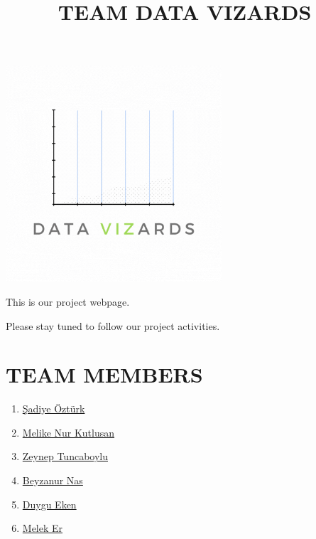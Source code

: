 \documentclass[
  11pt,
  a4paper,
  DIV=11,
  numbers=noendperiod]{scrartcl}
\title{TEAM DATA VIZARDS}
\author{}
\date{}
\begin{document}
\maketitle
\ifdefined\Shaded\renewenvironment{Shaded}{\begin{tcolorbox}[breakable, sharp corners, boxrule=0pt, borderline west={3pt}{0pt}{shadecolor}, frame hidden, enhanced, interior hidden]}{\end{tcolorbox}}\fi

\includegraphics[width=3.16667in,height=\textheight]{images/DataVizards 2.gif}

This is our project webpage.

Please stay tuned to follow our project activities.

\hypertarget{team-members}{%
\section{TEAM MEMBERS}\label{team-members}}

\begin{enumerate}
\def\labelenumi{\arabic{enumi}.}
\item
  \href{https://emu-hacettepe-analytics.github.io/emu430-fall2023-sadiye-1/}{Şadiye
  Öztürk}
\item
  \href{https://emu-hacettepe-analytics.github.io/emu430-fall2023-melikekutlusan/}{Melike
  Nur Kutlusan}
\item
  \href{https://emu-hacettepe-analytics.github.io/emu430-fall2023-zeyneptnc/}{Zeynep
  Tuncaboylu}
\item
  \href{https://emu-hacettepe-analytics.github.io/emu430-fall2023-beyzanurnas/}{Beyzanur
  Nas}
\item
  \href{https://github.com/emu-hacettepe-analytics/emu430-fall2023-dygekn}{Duygu
  Eken}
\item
  \href{https://github.com/emu-hacettepe-analytics/emu430-fall2023-Meleker.git}{Melek
  Er}
\end{enumerate}
\end{document}
